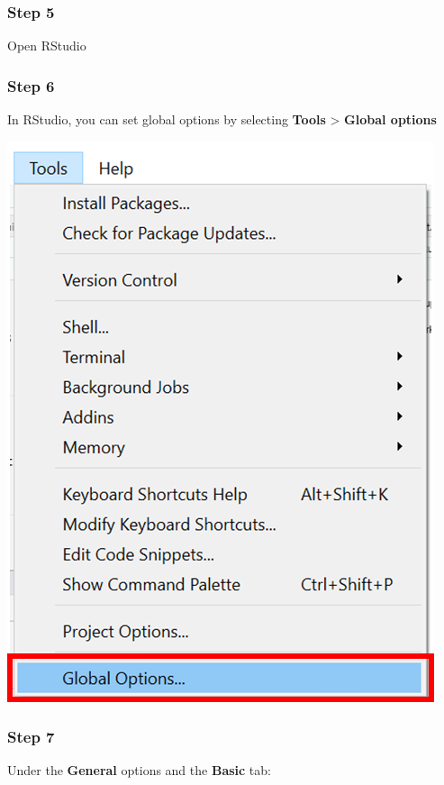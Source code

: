 \documentclass[
  letterpaper,
  DIV=11,
  numbers=noendperiod,
  oneside]{scrreprt}
\begin{document}
\hypertarget{step-5-1}{%
\subsubsection{Step 5}\label{step-5-1}}

Open RStudio

\hypertarget{step-6-1}{%
\subsubsection{Step 6}\label{step-6-1}}

In RStudio, you can set global options by selecting \textbf{Tools}
\textgreater{} \textbf{Global options}

\includegraphics{./images/paste-D0B6CCF0.png}

\hypertarget{step-7}{%
\subsubsection{Step 7}\label{step-7}}

Under the \textbf{General} options and the \textbf{Basic} tab:
\end{document}

